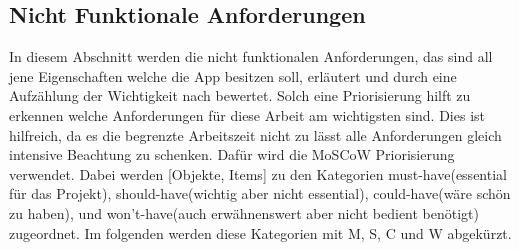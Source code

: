 \subsection{Nicht Funktionale Anforderungen}\label{subsection:anforderung:nichtFunktionaleAnforderungen}\myCheckmark
In diesem Abschnitt werden die nicht funktionalen Anforderungen, das sind all jene Eigenschaften welche die App besitzen soll, erläutert und durch eine Aufzählung der Wichtigkeit nach bewertet.\newline%
Solch eine Priorisierung hilft zu erkennen welche Anforderungen für diese Arbeit am wichtigsten sind. Dies ist hilfreich, da es die begrenzte Arbeitszeit nicht zu lässt alle Anforderungen gleich intensive Beachtung zu schenken.\newline%
Dafür wird die MoSCoW Priorisierung verwendet. Dabei werden [Objekte, Items] zu den Kategorien \glqq must-have\grqq{}(essential für das Projekt), \glqq should-have\grqq{}(wichtig aber nicht essential), \glqq could-have\grqq{}(wäre schön zu haben), und \glqq won't-have\grqq{}(auch erwähnenswert aber nicht bedient benötigt) zugeordnet. Im folgenden werden diese Kategorien mit M, S, C und W abgekürzt.

